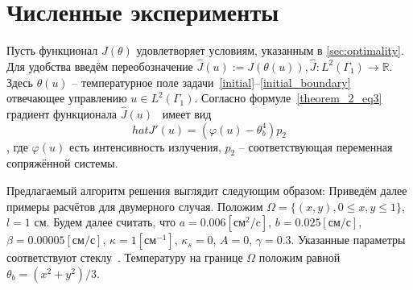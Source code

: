\documentclass[10pt]{article}
\begin{document}
    \section{Численные эксперименты}\label{sec:experiments}

    Пусть функционал $J(\theta)$ удовлетворяет условиям, указанным в \autoref{sec:optimality}.
    Для удобства введём переобозначение
    $\hat{J}(u):=J(\theta(u)), \hat{J}:L^2(\Gamma_1) \to \mathbb{R}$.
    Здесь $\theta(u)$ -- температурное поле задачи~\eqref{initial}--\eqref{initial_boundary}
    отвечающее управлению $u \in L^2(\Gamma_1)$.
    Согласно формуле~\eqref{theorem_2_eq3} градиент функционала $\hat{J}(u)$~\cite{grenkin_13}
    имеет вид \[ hat{J}'(u)= (\varphi(u) -\theta_b^4)p_2 \],
    где $\varphi(u)$ есть интенсивность излучения,
    $p_2$ -- соответствующая переменная сопряжённой системы.

    Предлагаемый алгоритм решения выглядит следующим образом:
    Приведём далее примеры расчётов для двумерного случая.
    Положим $\Omega = \{(x,y), 0 \leq x,y \leq 1\}$, $l = 1$ см.
    Будем далее считать, что $a = 0.006[\text{см}^2/\text{c}]$, $b=0.025[\text{см}/\text{с}]$,
    $\beta = 0.00005[\text{см}/\text{с}]$, $\kappa=1[\text{см}^{-1}]$, $\kappa_s = 0$, $A = 0$,
    $\gamma = 0.3$.
    Указанные параметры соответствуют стеклу~\cite{grenkin_13}.
    Температуру на границе $\Omega$ положим равной $\theta_b = (x^2+y^2)/3$.
\end{document}
